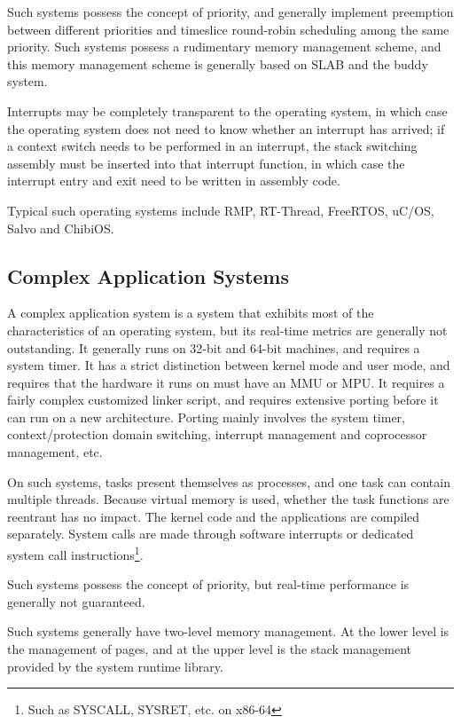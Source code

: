 Such systems possess the concept of priority, and generally implement preemption between different priorities and timeslice round-robin scheduling among the same priority. Such systems possess a rudimentary memory management scheme, and this memory management scheme is generally based on SLAB and the buddy system.

Interrupts may be completely transparent to the operating system, in which case the operating system does not need to know whether an interrupt has arrived; if a context switch needs to be performed in an interrupt, the stack switching assembly must be inserted into that interrupt function, in which case the interrupt entry and exit need to be written in assembly code.

Typical such operating systems include RMP, RT-Thread, FreeRTOS, uC/OS, Salvo and ChibiOS.

\subsection{Complex Application Systems}\label{subsec:1-complex-application-systems}

A complex application system is a system that exhibits most of the characteristics of an operating system, but its real-time metrics are generally not outstanding. It generally runs on 32-bit and 64-bit machines, and requires a system timer. It has a strict distinction between kernel mode and user mode, and requires that the hardware it runs on must have an MMU or MPU. It requires a fairly complex customized linker script, and requires extensive porting before it can run on a new architecture. Porting mainly involves the system timer, context/protection domain switching, interrupt management and coprocessor management, etc.

On such systems, tasks present themselves as processes, and one task can contain multiple threads. Because virtual memory is used, whether the task functions are reentrant has no impact. The kernel code and the applications are compiled separately. System calls are made through software interrupts or dedicated system call instructions\footnote{Such as SYSCALL, SYSRET, etc. on x86-64}.

Such systems possess the concept of priority, but real-time performance is generally not guaranteed.

Such systems generally have two-level memory management. At the lower level is the management of pages, and at the upper level is the stack management provided by the system runtime library.

